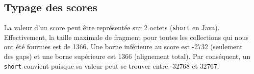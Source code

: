 \subsection{Typage des scores}
La valeur d'un score peut être représentée sur 2 octets (\texttt{short} en Java).
Effectivement, la taille maximale de fragment pour toutes les collections qui
nous ont été fournies est de 1366.
Une borne inférieure au score est -2732 (seulement des gaps)
et une borne supérieure est 1366 (alignement total).
Par conséquent, un \texttt{short} convient puisque sa valeur peut se trouver
entre -32768 et 32767.

